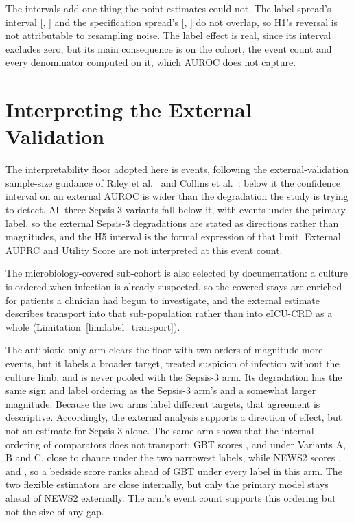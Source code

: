 The intervals add one thing the point estimates could not. The label spread's
interval [\pcSpreadLabelCiLo, \pcSpreadLabelCiHi] and the specification
spread's [\pcSpreadModelClassCiLo, \pcSpreadModelClassCiHi] do not overlap, so
H1's reversal is not attributable to resampling noise. The label effect is
real, since its interval excludes zero, but its main consequence is on the
cohort, the event count and every denominator computed on it, which AUROC does
not capture.


\section{Interpreting the External Validation}
\label{sec:external_interpretability}

The interpretability floor adopted here is \pcExtMinEvents{} events, following
the external-validation sample-size guidance of Riley et al.\
\cite{riley2019sample} and Collins et al.\ \cite{collins2024tripodai}: below it
the confidence interval on an external AUROC is wider than the degradation the
study is trying to detect. All three Sepsis-3 variants fall below it, with
\pcExtNEventsB{} events under the primary label, so the external Sepsis-3
degradations are stated as directions rather than magnitudes, and the H5
interval is the formal expression of that limit. External AUPRC and Utility
Score are not interpreted at this event count.

The microbiology-covered sub-cohort is also selected by documentation: a
culture is ordered when infection is already suspected, so the covered stays
are enriched for patients a clinician had begun to investigate, and the
external estimate describes transport into that sub-population rather than
into eICU-CRD as a whole (Limitation~\ref{lim:label_transport}).

The antibiotic-only arm clears the floor with two orders of magnitude more
events, but it labels a broader target, treated suspicion of infection without
the culture limb, and is never pooled with the Sepsis-3 arm. Its degradation
has the same sign and label ordering as the Sepsis-3 arm's and a somewhat
larger magnitude. Because the two arms label different targets, that agreement
is descriptive. Accordingly, the external analysis supports a direction of
effect, but not an estimate for Sepsis-3 alone. The same arm shows that the
internal ordering of comparators does not transport: GBT scores
\pcExtAbxAurocGbtA, \pcExtAbxAurocGbtB{} and \pcExtAbxAurocGbtC{} under
Variants A, B and C, close to chance under the two narrowest labels, while
NEWS2 scores \pcExtAbxAurocNewsA, \pcExtAbxAurocNewsB{} and
\pcExtAbxAurocNewsC, so a bedside score ranks ahead of GBT under every label in
this arm. The two flexible estimators are close
internally, but only the primary model stays ahead of NEWS2 externally. The
arm's event count supports this ordering but not the size of any gap.


